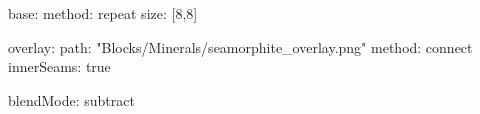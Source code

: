 base:
  method: repeat
  size: [8,8]

overlay:
  path: "Blocks/Minerals/seamorphite_overlay.png"
  method: connect
  innerSeams: true

blendMode: subtract